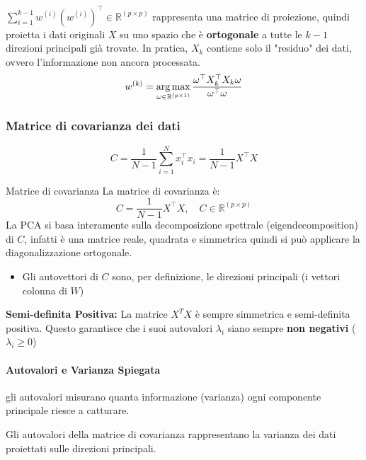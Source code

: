 	$\sum_{i=1}^{k-1}w^{(i)}(w^{(i)})^{\top}\in \mathbb{R}^{(p\times p)}$ rappresenta una matrice di proiezione, quindi proietta i dati originali $X$ su uno spazio che è \textbf{ortogonale} a tutte le $k-1$ direzioni principali già trovate. In pratica, $X_k$ contiene solo il "residuo" dei dati, ovvero l'informazione non ancora processata.
	$$
	w^{(k)}=\operatorname*{arg\,max}_{\omega\in\mathbb{R}^{(p\times1)}}\frac{\omega^{\top}X_{k}^{\top}X_{k}\omega}{\omega^{\top}\omega}
	$$
	
	\subsubsection{Matrice di covarianza dei dati}
		$$
		C = \frac{1}{N-1} \sum_{i=1}^{N} x_i^\top x_i = \frac{1}{N-1} X^\top X
		$$
		
		\begin{mybox2}{Matrice di covarianza}
			La matrice di covarianza è:
			$$
			C = \frac{1}{N-1} X^\top X,\quad C\in\mathbb{R}^{(p\times p)}
			$$
			La PCA si basa interamente sulla decomposizione spettrale (eigendecomposition) di $C$, infatti è una matrice reale, quadrata e simmetrica quindi si può applicare la diagonalizzazione ortogonale.
			\begin{itemize}[itemsep=3pt, topsep=3pt]
			  \item Gli autovettori di $C$ sono, per definizione, le direzioni principali (i vettori colonna di $W$)
			\end{itemize}
		\end{mybox2}
				
		\begin{mybox}
			\textbf{Semi-definita Positiva:} La matrice $X^TX$ è sempre simmetrica e semi-definita positiva. Questo garantisce che i suoi autovalori $\lambda_i$ siano sempre \textbf{non negativi} ($\lambda_i \ge 0$)
		\end{mybox}
		
		\paragraph{Autovalori e Varianza Spiegata}
		
		\begin{mybox}
			gli autovalori misurano quanta informazione (varianza) ogni componente principale riesce a catturare.\myvspace
			
			Gli autovalori della matrice di covarianza rappresentano la varianza dei dati proiettati sulle direzioni principali.
		\end{mybox}
		
